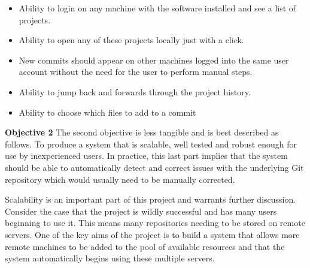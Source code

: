 \begin{itemize}
\item Ability to login on any machine with the software installed and see a list of projects.
\item Ability to open any of these projects locally just with a click.
\item New commits should appear on other machines logged into the same user account without the need for the user to perform manual steps.
\item Ability to jump back and forwards through the project history.
\item \color{red}Ability to choose which files to add to a commit \color{black}
\end{itemize}

\noindent \textbf{Objective 2} The second objective is less tangible and is best described as follows. To produce a system that is scalable, well tested and robust enough for use by inexperienced users. In practice, this last part implies that the system should be able to automatically detect and correct issues with the underlying Git repository which would usually need to be manually corrected.

Scalability is an important part of this project and warrants further discussion. Consider the case that the project is wildly successful and has many users beginning to use it. This means many repositories needing to be stored on remote servers. One of the key aims of the project is to build a system that allows more remote machines to be added to the pool of available resources and that the system automatically begins using these multiple servers.

